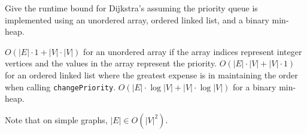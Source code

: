 \question Give the runtime bound for Dijkstra's assuming the priority queue is
implemented using an unordered array, ordered linked list, and a binary
min-heap.

\begin{solution}[1in]
$O(|E| \cdot 1 + |V| \cdot |V|)$ for an unordered array if the array indices
represent integer vertices and the values in the array represent the priority.
$O(|E| \cdot |V| + |V| \cdot 1)$ for an ordered linked list where the greatest
expense is in maintaining the order when calling \lstinline$changePriority$.
$O(|E| \cdot \log |V| + |V| \cdot \log |V|)$ for a binary min-heap.

Note that on simple graphs, $|E| \in O(|V|^2)$.
\end{solution}
